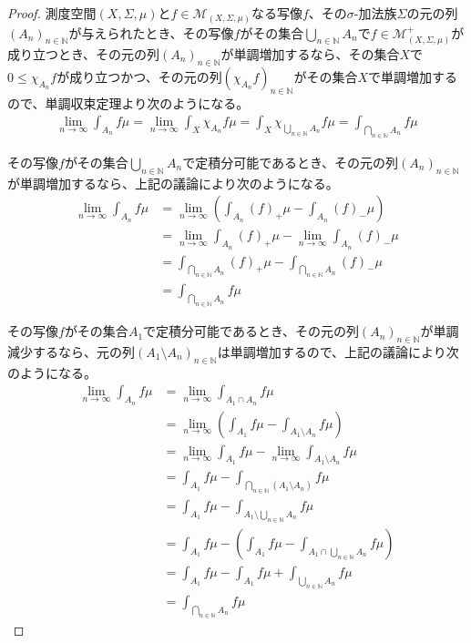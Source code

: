 \documentclass[dvipdfmx]{jsarticle}
\begin{document}
\begin{proof}
測度空間$(X,\varSigma,\mu)$と$f \in \mathcal{M}_{(X,\varSigma,\mu)}$なる写像$f$、その$\sigma$-加法族$\varSigma$の元の列$\left( A_{n} \right)_{n \in \mathbb{N}}$が与えられたとき、その写像$f$がその集合$\bigcup_{n \in \mathbb{N}} A_{n}$で$f \in \mathcal{M}_{(X,\varSigma,\mu)}^{+}$が成り立つとき、その元の列$\left( A_{n} \right)_{n \in \mathbb{N}}$が単調増加するなら、その集合$X$で$0 \leq \chi_{A_{n}}f$が成り立つかつ、その元の列$\left( \chi_{A_{n}}f \right)_{n \in \mathbb{N}}$がその集合$X$で単調増加するので、単調収束定理より次のようになる。
\begin{align*}
\lim_{n \rightarrow \infty}{\int_{A_{n}} {f\mu}} = \lim_{n \rightarrow \infty}{\int_{X} {\chi_{A_{n}}f\mu}} = \int_{X} {\chi_{\bigcup_{n \in \mathbb{N}} A_{n}}f\mu} = \int_{\bigcap_{n \in \mathbb{N}} A_{n}} {f\mu}
\end{align*}\par
その写像$f$がその集合$\bigcup_{n \in \mathbb{N}} A_{n}$で定積分可能であるとき、その元の列$\left( A_{n} \right)_{n \in \mathbb{N}}$が単調増加するなら、上記の議論により次のようになる。
\begin{align*}
\lim_{n \rightarrow \infty}{\int_{A_{n}} {f\mu}} &= \lim_{n \rightarrow \infty}\left( \int_{A_{n}} {(f)_{+}\mu} - \int_{A_{n}} {(f)_{-}\mu} \right)\\
&= \lim_{n \rightarrow \infty}{\int_{A_{n}} {(f)_{+}\mu}} - \lim_{n \rightarrow \infty}{\int_{A_{n}} {(f)_{-}\mu}}\\
&= \int_{\bigcap_{n \in \mathbb{N}} A_{n}} {(f)_{+}\mu} - \int_{\bigcap_{n \in \mathbb{N}} A_{n}} {(f)_{-}\mu}\\
&= \int_{\bigcap_{n \in \mathbb{N}} A_{n}} {f\mu}
\end{align*}\par
その写像$f$がその集合$A_{1}$で定積分可能であるとき、その元の列$\left( A_{n} \right)_{n \in \mathbb{N}}$が単調減少するなら、元の列$\left( A_{1} \setminus A_{n} \right)_{n \in \mathbb{N}}$は単調増加するので、上記の議論により次のようになる。
\begin{align*}
\lim_{n \rightarrow \infty}{\int_{A_{n}} {f\mu}} &= \lim_{n \rightarrow \infty}{\int_{A_{1} \cap A_{n}} {f\mu}}\\
&= \lim_{n \rightarrow \infty}\left( \int_{A_{1}} {f\mu} - \int_{A_{1} \setminus A_{n}} {f\mu} \right)\\
&= \lim_{n \rightarrow \infty}{\int_{A_{1}} {f\mu}} - \lim_{n \rightarrow \infty}{\int_{A_{1} \setminus A_{n}} {f\mu}}\\
&= \int_{A_{1}} {f\mu} - \int_{\bigcap_{n \in \mathbb{N}} \left( A_{1} \setminus A_{n} \right)} {f\mu}\\
&= \int_{A_{1}} {f\mu} - \int_{A_{1} \setminus \bigcup_{n \in \mathbb{N}} A_{n}} {f\mu}\\
&= \int_{A_{1}} {f\mu} - \left( \int_{A_{1}} {f\mu} - \int_{A_{1} \cap \bigcup_{n \in \mathbb{N}} A_{n}} {f\mu} \right)\\
&= \int_{A_{1}} {f\mu} - \int_{A_{1}} {f\mu} + \int_{\bigcup_{n \in \mathbb{N}} A_{n}} {f\mu}\\
&= \int_{\bigcap_{n \in \mathbb{N}} A_{n}} {f\mu}
\end{align*}
\end{proof}
\end{document}
